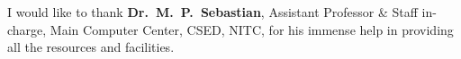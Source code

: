 I would like to thank \textbf {Dr.~M.~P.~Sebastian}, Assistant Professor \& Staff in-charge, Main Computer Center, CSED, NITC, for his immense help in providing all the resources and facilities.
